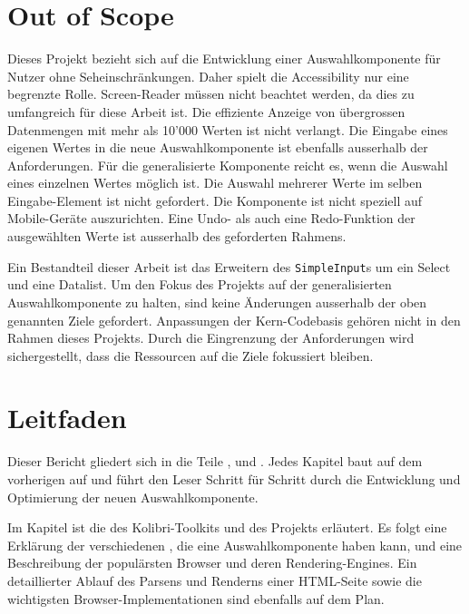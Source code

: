 \section{Out of Scope}
\label{sec:outOfScope}

Dieses Projekt bezieht sich auf die Entwicklung einer Auswahlkomponente für Nutzer ohne Seheinschränkungen.
Daher spielt die Accessibility nur eine begrenzte Rolle.
Screen-Reader müssen nicht beachtet werden, da dies zu umfangreich für diese Arbeit ist.
Die effiziente Anzeige von übergrossen Datenmengen mit mehr als 10'000 Werten ist nicht verlangt.
Die Eingabe eines eigenen Wertes in die neue Auswahlkomponente ist ebenfalls ausserhalb der Anforderungen.
Für die generalisierte Komponente reicht es, wenn die Auswahl eines einzelnen Wertes möglich ist.
Die Auswahl mehrerer Werte im selben Eingabe-Element ist nicht gefordert.
Die Komponente ist nicht speziell auf Mobile-Geräte auszurichten. 
Eine Undo- als auch eine Redo-Funktion der ausgewählten Werte ist ausserhalb des geforderten Rahmens. 

Ein Bestandteil dieser Arbeit ist das Erweitern des \texttt{SimpleInput}s um ein Select und eine Datalist.
Um den Fokus des Projekts auf der generalisierten Auswahlkomponente zu halten, sind keine Änderungen ausserhalb der oben genannten Ziele gefordert.
Anpassungen der Kern-Codebasis gehören nicht in den Rahmen dieses Projekts.
Durch die Eingrenzung der Anforderungen wird sichergestellt, dass die Ressourcen auf die Ziele fokussiert bleiben.


\section{Leitfaden}
\label{sec:tocTexted}

Dieser Bericht gliedert sich in die Teile \textbf{}, \textbf{} und \textbf{}.
Jedes Kapitel baut auf dem vorherigen auf und führt den Leser Schritt für Schritt durch die Entwicklung und Optimierung der neuen Auswahlkomponente.

Im Kapitel \textbf{} ist die \textbf{} des Kolibri-Toolkits und des Projekts erläutert.
Es folgt eine Erklärung der verschiedenen \textbf{}, die eine Auswahlkomponente haben kann, und eine Beschreibung der populärsten Browser und deren Rendering-Engines.
Ein detaillierter Ablauf des Parsens und Renderns einer HTML-Seite sowie die wichtigsten Browser-Implementationen sind ebenfalls auf dem Plan.

